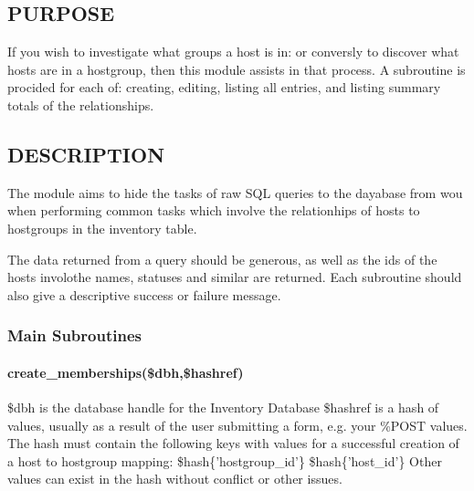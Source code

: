 \documentclass{book}
\begin{document}
\subsection{PURPOSE}
\label{Inventory::Memberships_PURPOSE}
\hypertarget{Inventory::Memberships_PURPOSE}{}



If you wish to investigate what groups a host is in: or conversly to discover what hosts are in a hostgroup, then this module assists in that process. A subroutine is procided for each of: creating, editing, listing all entries, and listing summary totals of the relationships.


\subsection{DESCRIPTION}
\label{Inventory::Memberships_DESCRIPTION}
\hypertarget{Inventory::Memberships_DESCRIPTION}{}



The module aims to hide the tasks of raw SQL queries to the dayabase from wou when performing common tasks which involve the relationhips of hosts to hostgroups in the inventory table.



The data returned from a query should be generous, as well as the ids of the hosts involothe names, statuses and similar are returned. Each subroutine should also give a descriptive success or failure message.


\subsubsection{Main Subroutines}
\label{Inventory::Memberships_Main_Subroutines}
\hypertarget{Inventory::Memberships_Main_Subroutines}{}


\paragraph*{create\protect\_memberships(\$dbh,\$hashref)}
\label{Inventory::Memberships_create_memberships_dbh_hashref_}
\hypertarget{Inventory::Memberships_create_memberships_dbh_hashref_}{}



\$dbh is the database handle for the Inventory Database \$hashref is a hash of values, usually as a result of the user submitting a form, e.g. your \%POST values. The hash must contain the following keys with values for a successful creation of a host to hostgroup mapping: \$hash\{'hostgroup\_id'\} \$hash\{'host\_id'\} Other values can exist in the hash without conflict or other issues.
\end{document}
